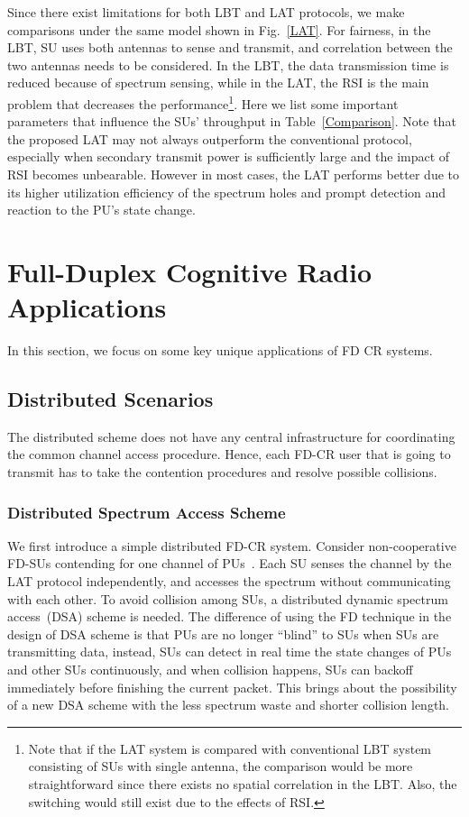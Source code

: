 \documentclass[onecolumn,12pt]{IEEEtran}
\begin{document}
Since there exist limitations for both LBT and LAT protocols, we make comparisons under the same model shown in Fig.~\ref{LAT}. For fairness, in the LBT, SU uses both antennas to sense and transmit, and correlation between the two antennas needs to be considered. In the LBT, the data transmission time is reduced because of spectrum sensing, while in the LAT, the RSI is the main problem that decreases the performance\footnote{Note that if the LAT system is compared with conventional LBT system consisting of SUs with single antenna, the comparison would be more straightforward since there exists no spatial correlation in the LBT. Also, the switching would still exist due to the effects of RSI.}. Here we list some important parameters that influence the SUs' throughput in Table~\ref{Comparison}. Note that the proposed LAT may not always outperform the conventional protocol, especially when secondary transmit power is sufficiently large and the impact of RSI becomes unbearable. However in most cases, the LAT performs better due to its higher utilization efficiency of the spectrum holes and prompt detection and reaction to the PU's state change.







\section{Full-Duplex Cognitive Radio Applications}


In this section, we focus on some key unique applications of FD CR systems.
\subsection{Distributed Scenarios}

The distributed scheme does not have any central infrastructure for coordinating the common channel access procedure. Hence, each FD-CR user that is going to transmit has to take the contention procedures and resolve possible collisions.



\subsubsection{Distributed Spectrum Access Scheme}
We first introduce a simple distributed FD-CR system. Consider  non-cooperative FD-SUs contending for one channel of PUs~\cite{liao2015icc}. Each SU senses the channel by the LAT protocol independently, and accesses the spectrum without communicating with each other. To avoid collision among SUs, a distributed dynamic spectrum access~(DSA) scheme is needed. The difference of using the FD technique in the design of DSA scheme is that PUs are no longer ``blind'' to SUs when SUs are transmitting data, instead, SUs can detect in real time the state changes of PUs and other SUs continuously, and when collision happens, SUs can backoff immediately before finishing the current packet. This brings about the possibility of a new DSA scheme with the less spectrum waste and shorter collision length.
\end{document}
